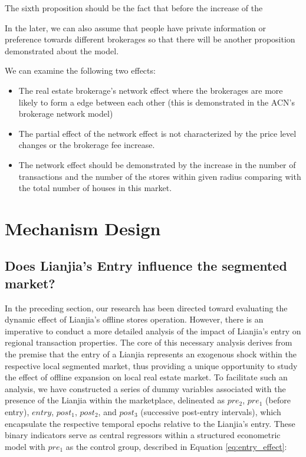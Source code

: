 \documentclass[12pt]{article}
\begin{document}
The sixth proposition should be the fact that before the increase of the 











In the later, we can also assume that people have private information or preference towards different brokerages so that there will be another proposition demonstrated about the model.

We can examine the following two effects:

\begin{itemize}
  \item The real estate brokerage's network effect where the brokerages are more likely to form a edge between each other (this is demonstrated in the ACN's brokerage network model)
  \item The partial effect of the network effect is not characterized by the price level changes or the brokerage fee increase.
  \item The network effect should be demonstrated by the increase in the number of transactions and the number of the stores within given radius comparing with the total number of houses in this market.
\end{itemize}



\section{Mechanism Design} \label{sec:mechanism_design}

\subsection{Does Lianjia's Entry influence the segmented market?} \label{subsec:entry_effect}

In the preceding section, our research has been directed toward evaluating the dynamic effect of Lianjia's offline stores operation. However, there is an imperative to conduct a more detailed analysis of the impact of Lianjia's entry on regional transaction properties. The core of this necessary analysis derives from the premise that the entry of a Lianjia represents an exogenous shock within the respective local segmented market, thus providing a unique opportunity to study the effect of offline expansion on local real estate market. To facilitate such an analysis, we have constructed a series of dummy variables associated with the presence of the Lianjia within the marketplace, delineated as $pre_2$, $pre_1$ (before entry), $entry$, $post_1$, $post_2$, and $post_3$ (successive post-entry intervals), which encapsulate the respective temporal epochs relative to the Lianjia's entry. These binary indicators serve as central regressors within a structured econometric model with $pre_1$ as the control group, described in Equation \eqref{eq:entry_effect}:
\end{document}
